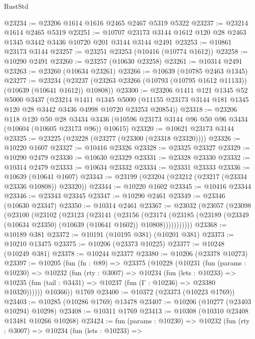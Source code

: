 \begin{lexlean}{RustStd}
\begin{coremodule}
@23234 := @23206 @1614 @1616 @2465 @2467 @5319 @5322
@23237 := @23214 @1614 @2465 @5319
@23251 := @10707 @23173 @3144 @1612 @120 @28 @2463 @1345 @3442 @3436 @10720 @201 @3144 @3144 @2491
@23253 := @10861 @23173 @3144
@23257 := @23251 @23253 (@10416 (@10774 @1612))
@23258 := @10290 @2491
@23260 := @23257 (@10630 @23258)
@23261 := @10314 @2491
@23263 := @23260 (@10634 @23261)
@23266 := @10639 (@10785 @2463 @1345)
@23277 := @23234
    (@23237 (@23263 @23266 (@10793 (@10795 @1612 @11133)) (@10639 (@10641 @1612)) @10808))
@23300 := @23206
    @1411
    @121
    @1345
    @52
    @5000
    @3437
    (@23214
      @1411
      @1345
      @5000
      (@11155 @23173 @3144 @181 @1345 @120 @28 @3442 @3436 @4998 @10720 @23253 @20854))
@23318 := @23206
    @118
    @120
    @50
    @28
    @3434
    @3436
    (@10596 @23173 @3144 @96 @50 @96 @3434 (@10604 (@10605 @23173 @96)) @10615)
@23320 := @10621 @23173 @3144
@23325 := @23225 (@23228 (@23277 (@23300 (@23318 @23320))))
@23326 := @10220 @1607
@23327 := @10416 @23326
@23328 := @23325 @23327
@23329 := @10290 @2479
@23330 := @10630 @23329
@23331 := @23328 @23330
@23332 := @10314 @2479
@23333 := @10634 @23332
@23334 := @23331 @23333
@23336 := @10639 (@10641 @1607)
@23343 := @23199 (@23204 (@23212 (@23217 (@23334 @23336 @10808)) @23320))
@23344 := @10220 @1602
@23345 := @10416 @23344
@23346 := @23343 @23345
@23347 := @10290 @2461
@23349 := @23346 (@10630 @23347)
@23350 := @10314 @2461
@23367 := @23032
    (@23057
      (@23098
        (@23100
          (@23102
            (@23123
              (@23141
                (@23156
                  (@23174
                    (@23185
                      (@23189 (@23349 (@10634 @23350) (@10639 (@10641 @1602)) @10808)))))))))))
@23368 := @10189 @381
@23372 := @10191 (@10195 @381) (@10201 @381)
@23373 := @10210 @13475
@23375 := @10206 (@23373 @10225)
@23377 := @10248 (@10249 @381)
@23378 := @10244 @23377
@23380 := @10206 (@23378 @10273)
@23397 := @10205
    (fun (fn : @89) =>
    @23375
      (@10228
        (@10231
          (fun (params : @10230) =>
          @10232
            (fun (rty : @3007) =>
            @10234
              (fun (lets : @10233) =>
              @10235 (fun (tail : @3431) => @10237 (fun (Γ : @10236) => @23380 @10320))))))
        @10366))
    @1769
@23400 := @10372 (@23373 (@10223 @1769))
@23403 := @10285 (@10286 @1769) @13478
@23407 := @10206 (@10277 (@23403 @10294) @10298)
@23408 := @10311 @1769
@23413 := @10308 (@10310 @23408 @13481 @10266 @10268)
@23424 := fun (params : @10230) =>
  @10232
    (fun (rty : @3007) =>
    @10234
      (fun (lets : @10233) =>

\end{coremodule}
\end{lexlean}
